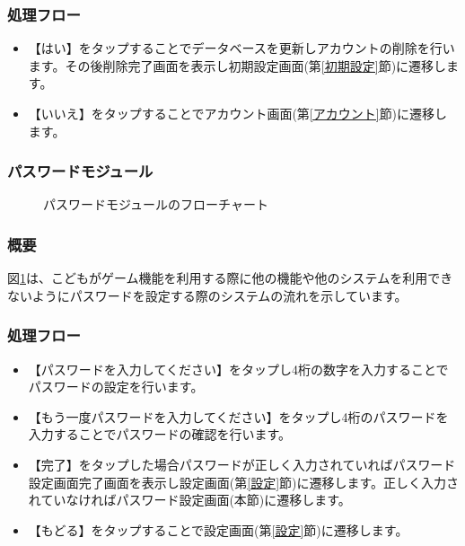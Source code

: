 \documentclass[a4j]{jarticle}
\begin{document}
\subsubsection*{処理フロー}
\begin{itemize}
\item 【はい】をタップすることでデータベースを更新しアカウントの削除を行います。その後削除完了画面を表示し初期設定画面(第\ref{初期設定}節)に遷移します。
\item 【いいえ】をタップすることでアカウント画面(第\ref{アカウント}節)に遷移します。
\end{itemize}

\subsubsection{パスワードモジュール\label{パスワード}} %
\begin{figure}[H]
    \begin{center}
    \caption {パスワードモジュールのフローチャート}
    \label{設定_パスワード}
    \end{center}
\end{figure}
\subsubsection*{概要}
図\ref{設定_パスワード}は、こどもがゲーム機能を利用する際に他の機能や他のシステムを利用できないようにパスワードを設定する際のシステムの流れを示しています。
\subsubsection*{処理フロー}
\begin{itemize}
\item 【パスワードを入力してください】をタップし4桁の数字を入力することでパスワードの設定を行います。
\item【もう一度パスワードを入力してください】をタップし4桁のパスワードを入力することでパスワードの確認を行います。
\item 【完了】をタップした場合パスワードが正しく入力されていればパスワード設定画面完了画面を表示し設定画面(第\ref{設定}節)に遷移します。正しく入力されていなければパスワード設定画面(本節)に遷移します。
\item 【もどる】をタップすることで設定画面(第\ref{設定}節)に遷移します。
\end{itemize}
\end{document}
